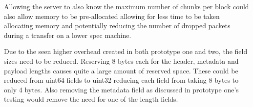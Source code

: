 Allowing the server to also know the maximum number of chunks per block could also allow memory to be pre-allocated allowing for less time to be taken allocating memory and potentially reducing the number of dropped packets during a transfer on a lower spec machine.

Due to the seen higher overhead created in both prototype one and two, the field sizes need to be reduced. Reserving 8 bytes each for the header, metadata and payload lengths causes quite a large amount of reserved space. These could be reduced from uint64 fields to uint32 reducing each field from taking 8 bytes to only 4 bytes. Also removing the metadata field as discussed in prototype one's testing would remove the need for one of the length fields.
